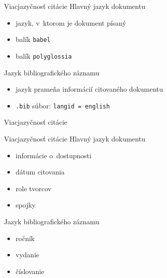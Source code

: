 \documentclass{beamer}
\newcommand{\cmd}[1]{\texttt{#1}}
\begin{document}
\begin{frame}{Viacjazyčnosť citácie}
Hlavný jazyk dokumentu
\begin{itemize}
\item jazyk, v~ktorom je dokument písaný
\item balík \texttt{babel} %
\item balík \texttt{polyglossia}
\end{itemize}

Jazyk bibliografického záznamu
\begin{itemize}
\item jazyk prameňa informácií citovaného dokumentu
\item \texttt{.bib} súbor: \cmd{langid = {english}}
\end{itemize}
\end{frame}

\begin{frame}{Viacjazyčnosť citácie}
\newline
\end{frame}

\begin{frame}{Viacjazyčnosť citácie}
Hlavný jazyk dokumentu
\begin{itemize}
\item informácie o~dostupnosti %
\item dátum citovania %
\item role tvorcov %
\item spojky %
\end{itemize}

Jazyk bibliografického záznamu
\begin{itemize}
\item ročník %
\item vydanie %
\item číslovanie %
\end{itemize}
\end{frame}
\end{document}
